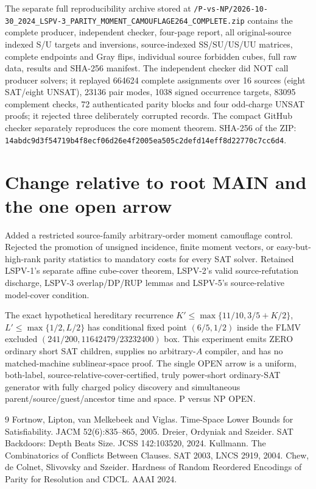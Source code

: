\documentclass[11pt]{article}
\begin{document}
The separate full reproducibility archive stored at \texttt{/P-vs-NP/2026-10-30\_2024\_LSPV-3\_PARITY\_MOMENT\_CAMOUFLAGE264\_COMPLETE.zip} contains the complete producer, independent checker, four-page report, all original-source indexed S/U targets and inversions, source-indexed SS/SU/US/UU matrices, complete endpoints and Gray flips, individual source forbidden cubes, full raw data, results and SHA-256 manifest. The independent checker did NOT call producer solvers; it replayed 664624 complete assignments over 16 sources (eight SAT/eight UNSAT), 23136 pair modes, 1038 signed occurrence targets, 83095 complement checks, 72 authenticated parity blocks and four odd-charge UNSAT proofs; it rejected three deliberately corrupted records. The compact GitHub checker separately reproduces the core moment theorem. SHA-256 of the ZIP: \texttt{14abdc9d3f54719b4f8ecf06d26e4f2005ea505c2defd14eff8d22770c7cc6d4}.

\section{Change relative to root MAIN and the one open arrow}
Added a restricted source-family arbitrary-order moment camouflage control. Rejected the promotion of unsigned incidence, finite moment vectors, or easy-but-high-rank parity statistics to mandatory costs for every SAT solver. Retained LSPV-1's separate affine cube-cover theorem, LSPV-2's valid source-refutation discharge, LSPV-3 overlap/DP/RUP lemmas and LSPV-5's source-relative model-cover condition.

The exact hypothetical hereditary recurrence $K'\le\max\{11/10,3/5+K/2\}$, $L'\le\max\{1/2,L/2\}$ has conditional fixed point $(6/5,1/2)$ inside the FLMV excluded $(241/200,11642479/23232400)$ box. This experiment emits ZERO ordinary short SAT children, supplies no arbitrary-$A$ compiler, and has no matched-machine sublinear-space proof. The single OPEN arrow is a uniform, both-label, source-relative-cover-certified, truly power-short ordinary-SAT generator with fully charged policy discovery and simultaneous parent/source/guest/ancestor time and space. P versus NP OPEN.

\begin{thebibliography}{9}
 Fortnow, Lipton, van Melkebeek and Viglas. Time-Space Lower Bounds for Satisfiability. JACM 52(6):835--865, 2005.
 Dreier, Ordyniak and Szeider. SAT Backdoors: Depth Beats Size. JCSS 142:103520, 2024.
 Kullmann. The Combinatorics of Conflicts Between Clauses. SAT 2003, LNCS 2919, 2004.
 Chew, de Colnet, Slivovsky and Szeider. Hardness of Random Reordered Encodings of Parity for Resolution and CDCL. AAAI 2024.
\end{thebibliography}
\end{document}
